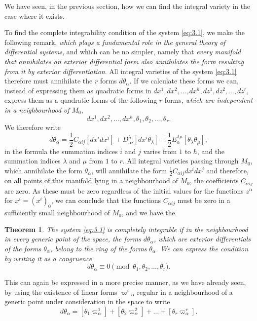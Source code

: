 \documentclass[leqno,11pt]{book}
\numberwithin{equation}{chapter}
\theoremstyle{shape1}
\newtheorem*{thm*}{\hspace{15pt}Theorem}
\theoremstyle{shape0}
\theoremstyle{shape2}
\theoremstyle{definition}
\begin{document}
We have seen, in the previous section, how we can find the integral variety in the case where it exists.

To find the complete integrability condition of the system \eqref{eq:3.1}, we make the following remark, \emph{which plays a fundamental role in the general theory of differential systems}, and which can be no simpler, namely that \emph{every manifold that annihilates an exterior differential form also annihilates the form resulting from it by exterior differentiation}. All integral varieties of the system \eqref{eq:3.1} therefore must annihilate the $r$ forms $d\theta_{\alpha}$. If we calculate these forms we can, instead of expressing them as quadratic forms in $dx^{1},dx^{2},\dots,dx^{h},dz^{1},dz^{2},\dots,dz^{r}$, express them as a quadratic forms of the following $r$ forms, \emph{which are independent in a neighbourhood of $M_{0}$},
\[
dx^{1},dx^{2},\dots,dx^{h},\theta_{1},\theta_{2},\dots,\theta_{r}.
\]
We therefore write
\begin{equation}
  \label{eq:3.3}
  d\theta_{\alpha}=\frac{1}{2}C_{\alpha ij}[dx^{i}dx^{j}]+D^{\lambda}_{\alpha i}[dx^{i}\theta_{\lambda}]+\frac{1}{2}E_{\alpha}^{\lambda\mu}[\theta_{\lambda}\theta_{\mu}],
\end{equation}
in the formula the summation indices $i$ and $j$ varies from $1$ to $h$, and the summation indices $\lambda$ and $\mu$ from $1$ to $r$. All integral varieties passing through $M_{0}$, which annihilate the form $\theta_{\alpha}$, will annihilate the form $\tfrac{1}{2}C_{\alpha ij}dx^{i}dx^{j}$ and therefore, on all points of this manifold lying in a neighbourhood of $M_{0}$, the coefficients $C_{\alpha ij}$ are zero. As these must be zero regardless of the initial values for the functions $z^{\alpha}$ for $x^{i}=(x^{i})_{0}$, we can conclude that the functions $C_{\alpha ij}$ must be zero in a sufficiently small neighbourhood of $M_{0}$, and we have the

\begin{thm*}
   The system \eqref{eq:3.1} is completely integrable if in the neighbourhood in every generic point of the space, the forms $d\theta_{\alpha}$, which are exterior differentials of the forms $\theta_{\alpha}$, belong to the ring of the forms $\theta_{\alpha}$. \rm{We can express the condition by writing it as a congruence}
\[
d\theta_{\alpha}\equiv 0\pmod{\theta_{1},\theta_{2},\dots,\theta_{r}}.
\]
\end{thm*}

This can again be expressed in a more precise manner, as we have already seen, by using the existence of linear forms $\varpi^{i}{}_{\alpha}$ regular in a neighbourhood of a generic point under consideration in the space to write
\begin{equation}
  \label{eq:3.4}
  d\theta_{\alpha}=[\theta_{1}\varpi^{1}_{\alpha}]+[\theta_{2}\varpi^{2}_{\alpha}]+\dots+[\theta_{r}\varpi^{r}_{\alpha}].
\end{equation}
\end{document}
